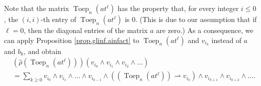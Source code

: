 \documentclass[etingof-lie.tex]{subfiles}
\begin{document}
Note that the matrix $\operatorname*{Toep}\nolimits_{n}\left(  at^{\ell
}\right)  $ has the property that, for every integer $i\leq0$, the $\left(
i,i\right)  $-th entry of $\operatorname*{Toep}\nolimits_{n}\left(  at^{\ell
}\right)  $ is $0$. (This is due to our assumption that if $\ell=0$, then the
diagonal entries of the matrix $a$ are zero.) As a consequence, we can apply
Proposition \ref{prop.glinf.ainfact} to $\operatorname*{Toep}\nolimits_{n}%
\left(  at^{\ell}\right)  $ and $v_{i_{k}}$ instead of $a$ and $b_{k}$, and
obtain%
\begin{align}
&  \left(  \widehat{\rho}\left(  \operatorname*{Toep}\nolimits_{n}\left(
at^{\ell}\right)  \right)  \right)  \left(  v_{i_{0}}\wedge v_{i_{1}}\wedge
v_{i_{2}}\wedge...\right) \nonumber\\
&  =\sum\limits_{k\geq0}v_{i_{0}}\wedge v_{i_{1}}\wedge...\wedge v_{i_{k-1}%
}\wedge\left(  \left(  \operatorname*{Toep}\nolimits_{n}\left(  at^{\ell
}\right)  \right)  \rightharpoonup v_{i_{k}}\right)  \wedge v_{i_{k+1}}\wedge
v_{i_{k+2}}\wedge.... \label{pf.glwave.F.4}%
\end{align}
\end{document}
